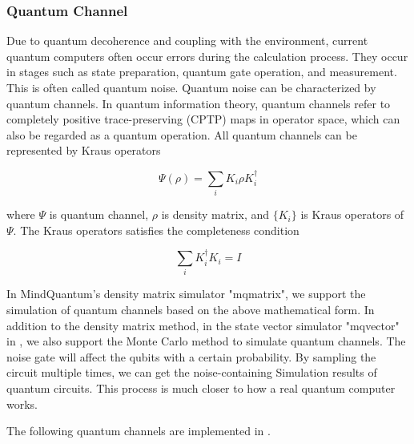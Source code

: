 \label{sec:noise_simulation}
\subsubsection{Quantum Channel}
Due to quantum decoherence and coupling with the environment, current quantum computers often occur errors during the calculation process. They occur in stages such as state preparation, quantum gate operation, and measurement. This is often called quantum noise. Quantum noise can be characterized by quantum channels. In quantum information theory, quantum channels refer to completely positive trace-preserving (CPTP) maps in operator space, which can also be regarded as a quantum operation. All quantum channels can be represented by Kraus operators

\begin{equation}
    \Psi(\rho) = \sum_i K_i \rho K_i^\dagger
\end{equation}

where $\Psi$ is quantum channel, $\rho$ is density matrix, and $\{K_i\}$ is Kraus operators of $\Psi$. The Kraus operators satisfies the completeness condition

\begin{equation}
    \sum_i K_i^\dagger K_i = I
\end{equation}

In MindQuantum's density matrix simulator "mqmatrix", we support the simulation of quantum channels based on the above mathematical form. In addition to the density matrix method, in the state vector simulator "mqvector" in \MindQuantum, we also support the Monte Carlo method to simulate quantum channels. The noise gate will affect the qubits with a certain probability. By sampling the circuit multiple times, we can get the noise-containing Simulation results of quantum circuits. This process is much closer to how a real quantum computer works.

The following quantum channels are implemented in \MindQuantum.

